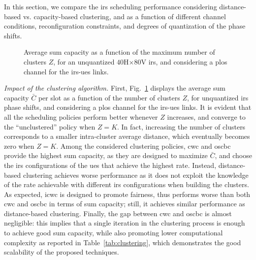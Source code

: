 In this section, we compare the \gls{irs} scheduling performance considering distance-based vs. capacity-based clustering, and as a function of different channel conditions, reconfiguration constraints, and degrees of quantization of the phase shifts. 

\begin{figure}[t]
    \centering
    \setlength{}
    \setlength{}
     
    \caption{Average sum capacity as a function of the maximum number of clusters $Z$, for an unquantized $40$H$\times80$V \gls{irs}, and considering a \gls{plos} channel for the \gls{irs}-\glspl{ue} links.}
    \label{fig:sumcap0bitlos}
\end{figure}

\emph{Impact of the clustering algorithm.}
First, Fig.~\ref{fig:sumcap0bitlos} displays the average sum capacity $\bar{C}$ per slot as a function of the number of clusters $Z$, for unquantized \gls{irs} phase shifts, and considering a \gls{plos} channel for the \gls{irs}-\glspl{ue} links. 
It is evident that all the scheduling policies perform better whenever $Z$ increases, and converge to the ``unclustered'' policy when $Z=K$. In fact, increasing the number of clusters corresponds to a smaller intra-cluster average distance, which eventually becomes zero when $Z=K$. 
Among the considered clustering policies, \gls{cwc} and \gls{oscbc} provide the highest sum capacity, as they are designed to maximize $\bar{C}$, and choose the \gls{irs} configurations of the \glspl{ue} that achieve the highest rate. Instead, distance-based clustering achieves worse performance as it does not exploit the knowledge of the rate achievable with different \gls{irs} configurations when building the clusters.
As expected, \gls{icwc} is designed to promote fairness, thus performs worse than both \gls{cwc} and \gls{oscbc} in terms of sum capacity; still, it achieves similar performance as distance-based clustering.
Finally, the gap between \gls{cwc} and \gls{oscbc} is almost negligible: this implies that a single iteration in the clustering process is enough to achieve good sum capacity, while also promoting lower computational complexity as reported in Table~\ref{tab:clustering}, which demonstrates the good scalability of the proposed techniques.


